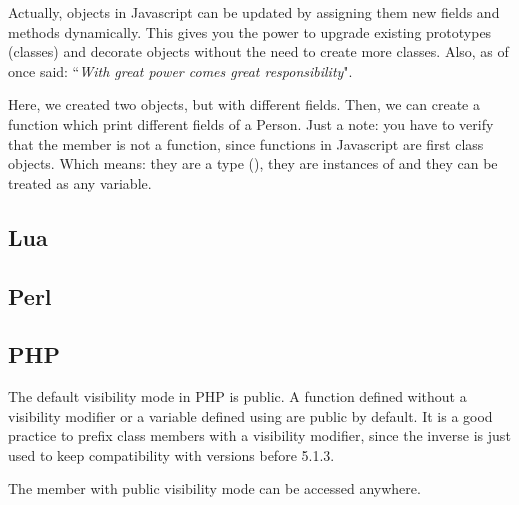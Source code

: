 \documentclass{KodeBook}
\begin{document}
Actually, objects in Javascript can be updated by assigning them new fields and methods dynamically. 
This gives you the power to upgrade existing prototypes (classes) and decorate objects without the need to create more classes.
Also, as  of  once said: ``\textit{With great power comes great responsibility}".



Here, we created two objects, but with different fields. 
Then, we can create a function which print different fields of a Person. 
Just a note: you have to verify that the member is not a function, since functions in Javascript are first class objects. 
Which means: they are a type (), they are instances of  and they can be treated as any variable.



\subsection{Lua}


\subsection{Perl}

%

\subsection{PHP}

The default visibility mode in PHP is public.
A function defined without a visibility modifier or a variable defined using  are public by default. 
It is a good practice to prefix class members with a visibility modifier, since the inverse is just used to keep compatibility with versions before 5.1.3.



The member with public visibility mode can be accessed anywhere.
\end{document}
